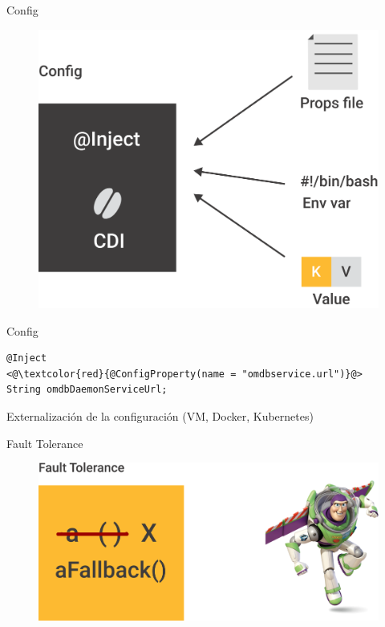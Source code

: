 \documentclass{beamer}
\begin{document}
\begin{frame}{Config}
\begin{figure}
	\centering
	\includegraphics[width=0.75\linewidth]{Images/config}
\end{figure}
\end{frame}




\begin{frame}[fragile]{Config}
\begin{lstlisting}
@Inject
<@\textcolor{red}{@ConfigProperty(name = "omdbservice.url")}@>
String omdbDaemonServiceUrl;
\end{lstlisting}

Externalización de la configuración (VM, Docker, Kubernetes)
\end{frame}


\begin{frame}{Fault Tolerance}
\begin{figure}
	\centering
	\includegraphics[width=0.75\linewidth]{Images/faulttolerance}
\end{figure}
\end{frame}
\end{document}
